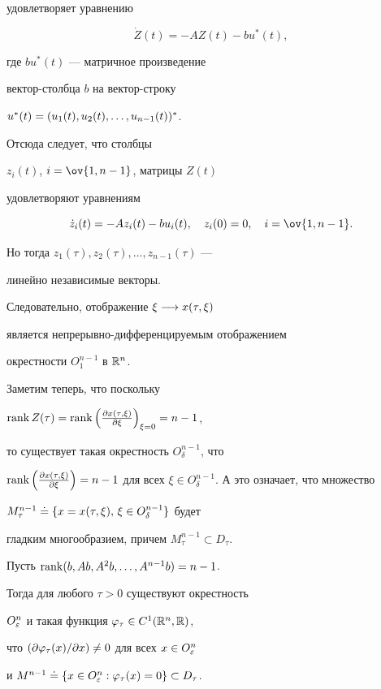 \begin{pf}
удовлетворяет уравнению


$$


\Dot Z(t) = -AZ(t) - bu^{*}(t),


$$


где $bu^{*}(t)$ --- матричное произведение


вектор-столбца $b$ на вектор-строку


$u^{*}(t)=(u_1(t),u_2(t),\linebreak \dotsc,u_{n-1}(t))^{*}$.


Отсюда следует, что столбцы


$z_i(t)$, $i=\ov{1,n-1}$, матрицы $Z(t)$


удовлетворяют уравнениям


$$


\Dot z_i(t)=-Az_i(t)-bu_i(t),\quad z_i(0)=0,\quad i=\ov{1,n-1}.


$$


Но тогда $z_1(\tau),z_2(\tau),\dotsc,z_{n-1}(\tau)$ ---


линейно независимые векторы.


Следовательно, отображение $\xi\longrightarrow x(\tau,\xi)$


является непрерывно-дифференцируемым отображением


окрестности $O^{n-1}_1$ в $\Bbb R^n$.


Заметим теперь, что поскольку


$\operatorname{rank} Z(\tau)=\operatorname{rank}\left(\frac{\partial x(\tau,\xi)}{\partial\xi}\right)_{\xi=0}=n-1$,


то существует такая окрестность $O^{n-1}_{\delta}$, что


$\rank\left(\frac{\Pt x(\tau,\xi)}{\Pt\xi}\right)=n-1$ для всех $\xi\in


O^{n-1}_{\delta}$.  А это означает, что множество


$M^{n-1}_{\tau}\doteq\{x=x(\tau,\xi),\,\xi\in O^{n-1}_{\delta}\}$ будет


гладким многообразием, причем $M^{n-1}_{\tau}\subset D_{\tau}$.


\end{pf}





\begin{cor}


Пусть $\operatorname{rank}(b,Ab,A^2b,\dotsc,A^{n-1}b)=n-1$.


Тогда для любого $\tau>0$ существуют окрестность


$O^n_{\varepsilon}$ и такая функция $\varphi_{\tau}\in C^1(\Bbb R^n,\Bbb R)$,


что $(\partial\varphi_{\tau}(x)/\partial x)\ne 0$ для всех $x\in O^n_{\varepsilon}$


и $M^{n-1}\doteq\{x\in O^n_{\varepsilon} : \varphi_{\tau}(x)=0\}\subset D_{\tau}$.


\end{cor}





